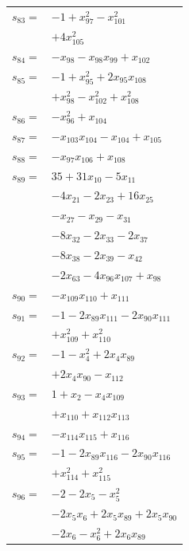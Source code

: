 \begin{longtable}{@{}r@{\;}l@{}}
\(s_{83}=\) & \(\displaystyle -1 +x_{97}^{2} -x_{101}^{2}\) \\
 & \(\displaystyle +4x_{105}^{2}\) \\[3pt]
\(s_{84}=\) & \(\displaystyle -x_{98} -x_{98}x_{99} +x_{102}\) \\[3pt]
\(s_{85}=\) & \(\displaystyle -1 +x_{95}^{2} +2x_{95}x_{108}\) \\
 & \(\displaystyle +x_{98}^{2} -x_{102}^{2} +x_{108}^{2}\) \\[3pt]
\(s_{86}=\) & \(\displaystyle -x_{96}^{2} +x_{104}\) \\[3pt]
\(s_{87}=\) & \(\displaystyle -x_{103}x_{104} -x_{104} +x_{105}\) \\[3pt]
\(s_{88}=\) & \(\displaystyle -x_{97}x_{106} +x_{108}\) \\[3pt]
\(s_{89}=\) & \(\displaystyle 35 +31x_{10} -5x_{11}\) \\
 & \(\displaystyle -4x_{21} -2x_{23} +16x_{25}\) \\
 & \(\displaystyle -x_{27} -x_{29} -x_{31}\) \\
 & \(\displaystyle -8x_{32} -2x_{33} -2x_{37}\) \\
 & \(\displaystyle -8x_{38} -2x_{39} -x_{42}\) \\
 & \(\displaystyle -2x_{63} -4x_{96}x_{107} +x_{98}\) \\[3pt]
\(s_{90}=\) & \(\displaystyle -x_{109}x_{110} +x_{111}\) \\[3pt]
\(s_{91}=\) & \(\displaystyle -1 -2x_{89}x_{111} -2x_{90}x_{111}\) \\
 & \(\displaystyle +x_{109}^{2} +x_{110}^{2}\) \\[3pt]
\(s_{92}=\) & \(\displaystyle -1 -x_{4}^{2} +2x_{4}x_{89}\) \\
 & \(\displaystyle +2x_{4}x_{90} -x_{112}\) \\[3pt]
\(s_{93}=\) & \(\displaystyle 1 +x_{2} -x_{4}x_{109}\) \\
 & \(\displaystyle +x_{110} +x_{112}x_{113}\) \\[3pt]
\(s_{94}=\) & \(\displaystyle -x_{114}x_{115} +x_{116}\) \\[3pt]
\(s_{95}=\) & \(\displaystyle -1 -2x_{89}x_{116} -2x_{90}x_{116}\) \\
 & \(\displaystyle +x_{114}^{2} +x_{115}^{2}\) \\[3pt]
\(s_{96}=\) & \(\displaystyle -2 -2x_{5} -x_{5}^{2}\) \\
 & \(\displaystyle -2x_{5}x_{6} +2x_{5}x_{89} +2x_{5}x_{90}\) \\
 & \(\displaystyle -2x_{6} -x_{6}^{2} +2x_{6}x_{89}\) \\

\end{longtable}

